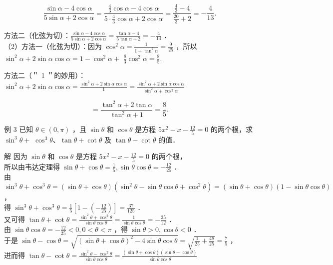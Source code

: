 \documentclass[10pt]{article}
\begin{document}
\[
\frac{\sin \alpha-4 \cos \alpha}{5 \sin \alpha+2 \cos \alpha}=\frac{\frac{4}{3} \cos \alpha-4 \cos \alpha}{5 \cdot \frac{4}{3} \cos \alpha+2 \cos \alpha}=\frac{\frac{4}{3}-4}{\frac{20}{3}+2}=-\frac{4}{13} .
\]

方法二（化弦为切）：\(\frac{\sin \alpha-4 \cos \alpha}{5 \sin \alpha+2 \cos \alpha}=\frac{\tan \alpha-4}{5 \tan \alpha+2}=-\frac{4}{13}\) ．\\
（2）方法一（化弦为切）：因为 \(\cos ^{2} \alpha=\frac{1}{1+\tan ^{2} \alpha}=\frac{9}{25}\) ，所以 \(\sin ^{2} \alpha+2 \sin \alpha \cos \alpha=1-\cos ^{2} \alpha+\) \(\frac{8}{3} \cos ^{2} \alpha=\frac{8}{5}\).

方法二（＂ 1 ＂的妙用）： \(\sin ^{2} \alpha+2 \sin \alpha \cos \alpha=\frac{\sin ^{2} \alpha+2 \sin \alpha \cos \alpha}{1}=\frac{\sin ^{2} \alpha+2 \sin \alpha \cos \alpha}{\sin ^{2} \alpha+\cos ^{2} \alpha}\)

\[
=\frac{\tan ^{2} \alpha+2 \tan \alpha}{\tan ^{2} \alpha+1}=\frac{8}{5} .
\]

例 3 已知 \(\theta \in(0, \pi)\) ，且 \(\sin \theta\) 和 \(\cos \theta\) 是方程 \(5 x^{2}-x-\frac{12}{5}=0\) 的两个根，求 \(\sin ^{3} \theta+\) \(\cos ^{3} \theta 、 \tan \theta+\cot \theta\) 及 \(\tan \theta-\cot \theta\) 的值．

解 因为 \(\sin \theta\) 和 \(\cos \theta\) 是方程 \(5 x^{2}-x-\frac{12}{5}=0\) 的两个根，\\
所以由韦达定理得 \(\sin \theta+\cos \theta=\frac{1}{5}, \sin \theta \cos \theta=-\frac{12}{25}\) ．\\
由 \(\sin ^{3} \theta+\cos ^{3} \theta=(\sin \theta+\cos \theta)\left(\sin ^{2} \theta-\sin \theta \cos \theta+\cos ^{2} \theta\right)=(\sin \theta+\cos \theta)(1-\sin \theta \cos \theta)\) ，\\
得 \(\sin ^{3} \theta+\cos ^{3} \theta=\frac{1}{5}\left[1-\left(-\frac{12}{25}\right)\right]=\frac{37}{125}\) ．\\
又可得 \(\tan \theta+\cot \theta=\frac{\sin ^{2} \theta+\cos ^{2} \theta}{\sin \theta \cos \theta}=\frac{1}{\sin \theta \cos \theta}=-\frac{25}{12}\) ．\\
由 \(\sin \theta \cos \theta=-\frac{12}{25}<0,0<\theta<\pi\) ，得 \(\sin \theta>0, \cos \theta<0\) ．\\
于是 \(\sin \theta-\cos \theta=\sqrt{(\sin \theta+\cos \theta)^{2}-4 \sin \theta \cos \theta}=\sqrt{\frac{1}{25}+\frac{48}{25}}=\frac{7}{5}\) ，\\
进而得 \(\tan \theta-\cot \theta=\frac{\sin ^{2} \theta-\cos ^{2} \theta}{\sin \theta \cos \theta}=\frac{(\sin \theta+\cos \theta)(\sin \theta-\cos \theta)}{\sin \theta \cos \theta}\)
\end{document}
